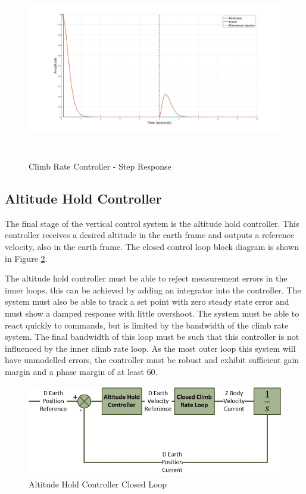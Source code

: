 \documentclass[12pt]{report}
\begin{document}
\begin{figure}[H]
	\centering
	\includegraphics[height = 8cm]{../Design/Matlab/Controllers/climb_rate_step.jpg}
	\caption{Climb Rate Controller -  Step Response}
	\label{IM_ClimbRateStep}
\end{figure}

\subsection{Altitude Hold Controller}
The final stage of the vertical control system is the altitude hold controller. This controller receives a desired altitude in the earth frame and outputs a reference velocity, also in the earth frame. The closed control loop block diagram is shown in Figure \ref{IM_AltHoldControlLoop}. 

The altitude hold controller must be able to reject measurement errors in the inner loops, this can be achieved by adding an integrator into the controller. The system must also be able to track a set point with zero steady state error and must show a damped response with little overshoot. The system must be able to react quickly to commands, but is limited by the bandwidth of the climb rate system. The final bandwidth of this loop must be such that this controller is not influenced by the inner climb rate loop. As the most outer loop this system will have unmodelled errors, the controller must be robust and exhibit sufficient gain margin and a phase margin of at least $60$\textdegree.

\begin{figure}[H]
	\centering
	\includegraphics[height = 4cm]{../References/Diagrams/AltHoldLoop.jpg}
	\caption{Altitude Hold Controller Closed Loop}
	\label{IM_AltHoldControlLoop}
\end{figure}
\end{document}
